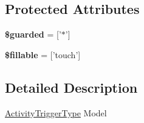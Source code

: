 \subsection*{Protected Attributes}
\begin{DoxyCompactItemize}
\item 
\hypertarget{classDMA_1_1Friends_1_1Models_1_1ActivityTriggerType_ae1a545d11aac2fccd87fab15f3bc1d25}{{\bfseries \$guarded} = \mbox{[}'$\ast$'\mbox{]}}\label{classDMA_1_1Friends_1_1Models_1_1ActivityTriggerType_ae1a545d11aac2fccd87fab15f3bc1d25}

\item 
\hypertarget{classDMA_1_1Friends_1_1Models_1_1ActivityTriggerType_a17079823cdd50a41abe50ea541c4438b}{{\bfseries \$fillable} = \mbox{[}'touch'\mbox{]}}\label{classDMA_1_1Friends_1_1Models_1_1ActivityTriggerType_a17079823cdd50a41abe50ea541c4438b}

\end{DoxyCompactItemize}


\subsection{Detailed Description}
\hyperlink{classDMA_1_1Friends_1_1Models_1_1ActivityTriggerType}{Activity\-Trigger\-Type} Model 

